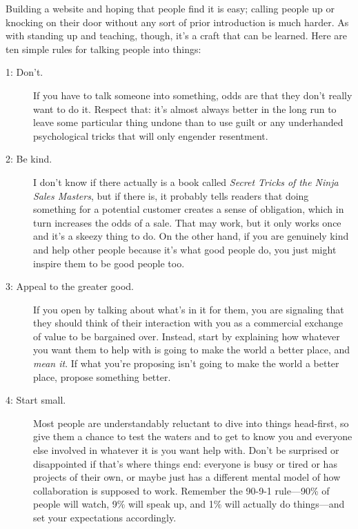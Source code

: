 
Building a website and hoping that people find it is easy;
calling people up or knocking on their door without any sort of prior introduction
is much harder.
As with standing up and teaching,
though,
it's a craft that can be learned.
Here are ten simple rules for talking people into things:

\begin{description}

\item[1: Don't.]
  If you have to talk someone into something,
  odds are that they don't really want to do it.
  Respect that:
  it's almost always better in the long run to leave some particular thing undone
  than to use guilt or any underhanded psychological tricks that will only engender resentment.

\item[2: Be kind.]
  I don't know if there actually is a book called
  \emph{Secret Tricks of the Ninja Sales Masters},
  but if there is,
  it probably tells readers that doing something for a potential customer
  creates a sense of obligation,
  which in turn increases the odds of a sale.
  That may work, but it only works once and it's a skeezy thing to do.
  On the other hand,
  if you are genuinely kind
  and help other people because it's what good people do,
  you just might inspire them to be good people too.

\item[3: Appeal to the greater good.]
  If you open by talking about what's in it for them,
  you are signaling that they should think of their interaction with you
  as a commercial exchange of value to be bargained over.
  Instead,
  start by explaining how whatever you want them to help with is going to make the world a better place,
  and \emph{mean it}.
  If what you're proposing isn't going to make the world a better place,
  propose something better.

\item[4: Start small.]
  Most people are understandably reluctant to dive into things head-first,
  so give them a chance to test the waters
  and to get to know you and everyone else involved in
  whatever it is you want help with.
  Don't be surprised or disappointed if that's where things end:
  everyone is busy or tired or has projects of their own,
  or maybe just has a different mental model of how collaboration is supposed to work.
  Remember the 90-9-1 rule---90\% of people will watch,
  9\% will speak up,
  and 1\% will actually do things---and set your expectations accordingly.


\end{description}
